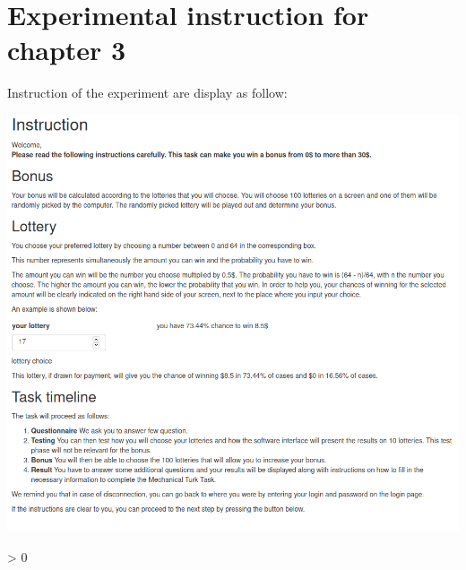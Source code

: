 \documentclass[
]{book}
\newlength{\cslhangindent}
\newenvironment{CSLReferences}[2] %
 {%
  \setlength{\parindent}{0pt}
  \ifodd #1 \everypar{\setlength{\hangindent}{\cslhangindent}}\ignorespaces\fi
  \ifnum #2 > 0
  \setlength{\parskip}{#2\baselineskip}
  \fi
 }%
 {}
\begin{document}
\hypertarget{expe-instruc4}{%
\chapter{Experimental instruction for chapter 3}\label{expe-instruc4}}

Instruction of the experiment are display as follow:

\includegraphics[width=0.9\linewidth,height=1.2\textheight]{annexe_file/consigne_c4}

\hypertarget{refs}{}
\begin{CSLReferences}{0}{0}
\end{CSLReferences}

  
\end{document}
